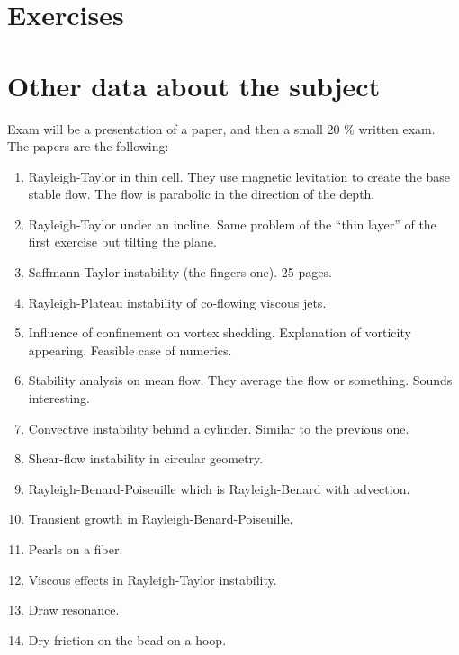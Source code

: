 \documentclass[palatino]{epflnotes}
\begin{document}
\appendix

\chapter{Exercises}


\chapter{Other data about the subject}

Exam will be a presentation of a paper, and then a small 20 \% written exam. The papers are the following:

\begin{enumerate}
	\item Rayleigh-Taylor in thin cell. They use magnetic levitation to create the base stable flow. The flow is parabolic in the direction of the depth.
	\item Rayleigh-Taylor under an incline. Same problem of the ``thin layer'' of the first exercise but tilting the plane.
	\item Saffmann-Taylor instability (the fingers one). 25 pages.
	\item Rayleigh-Plateau instability of co-flowing viscous jets.
	\item Influence of confinement on vortex shedding. Explanation of vorticity appearing. Feasible case of numerics.
	\item Stability analysis on mean flow. They average the flow or something. Sounds interesting.
	\item Convective instability behind a cylinder. Similar to the previous one.
	\item Shear-flow instability in circular geometry.
	\item Rayleigh-Benard-Poiseuille which is Rayleigh-Benard with advection.
	\item Transient growth in Rayleigh-Benard-Poiseuille.
	\item Pearls on a fiber.
	\item Viscous effects in Rayleigh-Taylor instability.
	\item Draw resonance.
	\item Dry friction on the bead on a hoop.
\end{enumerate}



\backmatter
\printindex
\end{document}

